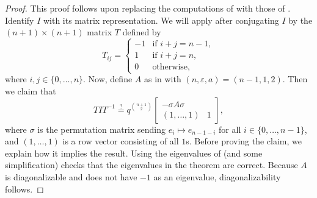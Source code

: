 \begin{proof}
    This proof follows  upon replacing the computations of  with those of .
    Identify $I$ with its matrix representation. We will apply  after conjugating $I$ by the $(n+1)\times(n+1)$ matrix $T$ defined by
    \[T_{ij}=\begin{cases}
        -1 & \text{if }i+j=n-1, \\
        1 & \text{if }i+j=n, \\
        0 & \text{otherwise},
    \end{cases}\]
    where $i,j\in\{0,\ldots,n\}$.
    Now, define $A$ as in  with $(n,\varepsilon,a)=(n-1,1,2)$. Then we claim that
    \begin{equation}
        TIT^{-1}\stackrel?=q^{\binom{n+1}2}\begin{bmatrix}
            -\sigma A\sigma \\
            (1,\ldots,1) & 1
        \end{bmatrix}, \label{eq:conjugate-sp-trivial}
    \end{equation}
    where $\sigma$ is the permutation matrix sending $e_i\mapsto e_{n-1-i}$ for all $i\in\{0,\ldots,n-1\}$, and $(1,\ldots,1)$ is a row vector consisting of all $1$s. Before proving the claim, we explain how it implies the result. Using the eigenvalues of  (and some simplification) checks that the eigenvalues in the theorem are correct. Because $A$ is diagonalizable and does not have $-1$ as an eigenvalue, diagonalizability follows.


\end{proof}
